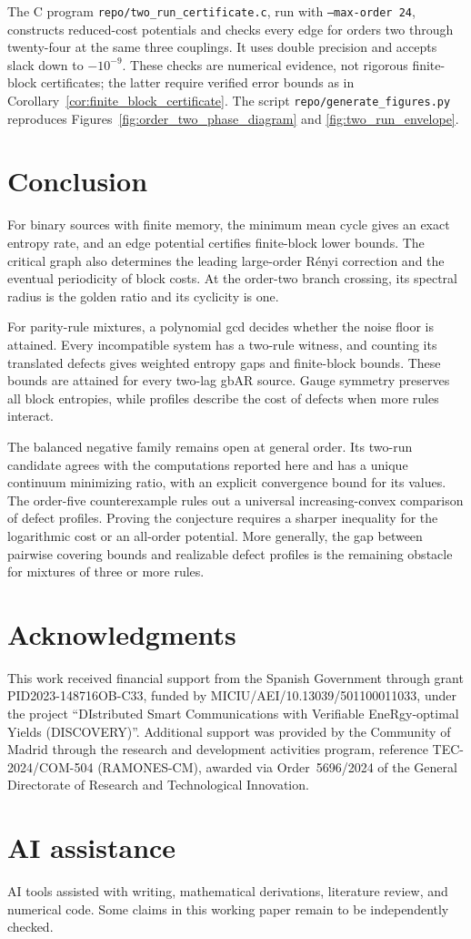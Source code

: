\documentclass[11pt,a4paper]{article}
\begin{document}
The C program \texttt{repo/two\_run\_certificate.c}, run with
\texttt{--max-order 24}, constructs reduced-cost potentials and checks
every edge for orders two through twenty-four at the same three
couplings.  It uses double precision and accepts slack down to
$-10^{-9}$.  These checks are numerical evidence, not rigorous
finite-block certificates; the latter require verified error bounds
as in Corollary~\ref{cor:finite_block_certificate}.
The script \texttt{repo/generate\_figures.py} reproduces
Figures~\ref{fig:order_two_phase_diagram} and
\ref{fig:two_run_envelope}.

\section{Conclusion}
\label{sec:conclusion}

For binary sources with finite memory, the minimum mean cycle gives
an exact entropy rate, and an edge potential certifies finite-block
lower bounds.  The critical graph also determines the leading
large-order R\'enyi correction and the eventual periodicity of block
costs.  At the order-two branch crossing, its spectral radius is the
golden ratio and its cyclicity is one.

For parity-rule mixtures, a polynomial gcd decides whether the noise
floor is attained.  Every incompatible system has a two-rule witness,
and counting its translated defects gives weighted entropy gaps and
finite-block bounds.  These bounds are attained for every two-lag
gbAR source.  Gauge symmetry preserves all block entropies, while
profiles describe the cost of defects when more rules interact.

The balanced negative family remains open at general order.  Its
two-run candidate agrees with the computations reported here and has
a unique continuum minimizing ratio, with an explicit convergence
bound for its values.  The order-five counterexample rules out a
universal increasing-convex comparison of defect profiles.  Proving
the conjecture requires a sharper inequality for the logarithmic cost
or an all-order potential.  More generally, the gap between pairwise
covering bounds and realizable defect profiles is the remaining
obstacle for mixtures of three or more rules.

\section*{Acknowledgments}

This work received financial support from the Spanish Government
through grant PID2023-148716OB-C33, funded by
MICIU/AEI/10.13039/501100011033, under the project ``DIstributed Smart
Communications with Verifiable EneRgy-optimal Yields (DISCOVERY)''.
Additional support was provided by the Community of Madrid through the
research and development activities program, reference
TEC-2024/COM-504 (RAMONES-CM), awarded via Order~5696/2024 of the
General Directorate of Research and Technological Innovation.

\section*{AI assistance}
AI tools assisted with writing, mathematical derivations, literature review, and numerical code. Some claims in this working paper remain to be independently checked.



\end{document}
